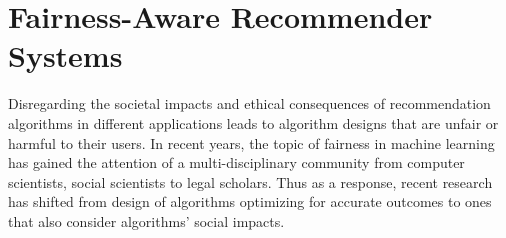     
    
    

\section{Fairness-Aware Recommender Systems}

Disregarding the societal impacts and ethical consequences of recommendation algorithms in different applications leads to algorithm designs that are unfair or harmful to their users. In recent years, the topic of fairness in machine learning has gained the attention of a multi-disciplinary community from computer scientists, social scientists to legal scholars. Thus as a response, recent research has shifted from design of algorithms optimizing for accurate outcomes to ones that also consider algorithms' social impacts. 

